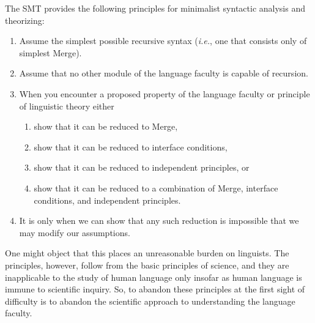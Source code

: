 \documentclass[MilwayThesis]{subfiles}
\begin{document}
The SMT provides the following principles for minimalist syntactic analysis and theorizing:
\begin{enumerate}[noitemsep]
	\item Assume the simplest possible recursive syntax (\textit{i.e.}, one that consists only of simplest Merge).
	\item Assume that no other module of the language faculty is capable of recursion.
	\item When you encounter a proposed property of the language faculty or principle of linguistic theory either 
		\begin{enumerate}[noitemsep]
			\item show that it can be reduced to Merge,
			\item show that it can be reduced to interface conditions,
			\item show that it can be reduced to independent principles, or
			\item show that it can be reduced to a combination of Merge, interface conditions, and independent principles.
		\end{enumerate}
	\item It is only when we can show that any such reduction is impossible that we may modify our assumptions.	
\end{enumerate}

One might object that this places an unreasonable burden on linguists.
The principles, however, follow from the basic principles of science, and they are inapplicable to the study of human language only insofar as human language is immune to scientific inquiry.
So, to abandon these principles at the first sight of difficulty is to abandon the scientific approach to understanding the language faculty.
\end{document}

